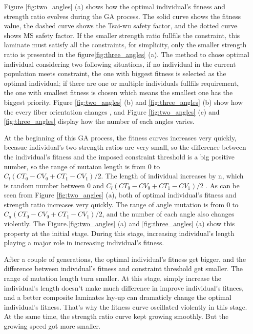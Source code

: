 Figure \ref{fig:two_angles} (a) shows how the optimal individual's fitness and
strength ratio evolves during the GA process. The solid curve shows the fitness
value, the dashed curve shows the Tsai-wu safety factor, and the dotted curve
shows MS safety factor. If the smaller strength ratio fullfils the constraint,
this laminate must satisfy all the constraints, for simplicity, only the smaller
strength ratio is presented in the figure\ref{fig:three_angles} (a). The method
to chose optimal individual considering two following situations, if no
individual in the current population meets constraint, the one with biggest
fitness is selected as the optimal individual; if there are one or multiple
individuals fullfils requirement, the one with smallest fitness is chosen which
means the smallest one has the biggest priority.  Figure \ref{fig:two_angles}
(b) and \ref{fig:three_angles} (b) show how the every fiber orientation changes , and
Figure \ref{fig:two_angles} (c) and \ref{fig:three_angles} display how the
number of each angles varies.

At the beginning of this GA process, the fitness curves increases very quickly,
becasue individual's two strength ratios are very small, so the difference
between the individual's fitness and the imposed constraint threshold is a big
positive number, so the range of mutaion length is from 0 to $C_l(CT_0 - CV_0 +
CT_1 - CV_1)/2$.  The length of individual increases by n, which is random
number between 0 and $C_l(CT_0 - CV_0 + CT_1 - CV_1)/2$ . As can be seen from
Figure \ref{fig:two_angles} (a), both of optimal individual's fitness and
strength ratio increases very quickly.  The range of angle mutation is from 0 to
$C_a(CT_0 - CV_0 + CT_1 - CV_1)/2$, and the number of each angle also changes
violently. The Figure.\ref{fig:two_angles} (a) and \ref{fig:three_angles} (a) show
this property at the initial stage.  During this stage, increasing individual's length playing a
major role in increasing individual's fitness.

After a couple of generations, the optimal individual's fitness get bigger, and
the difference between individual's fitness and constraint threshold get
smaller. The range of mutation length turn smaller. At
this stage, simply increase the individual's length doesn't make much difference
in improve individual's fitnees, and a better composite laminates lay-up can
dramaticly change the optimal individual's fitness. That's why the fitness curve
oscillated violently in this stage.  At the same time, the strength ratio curve
kept growing smoothly. But the growing speed got more smaller.

